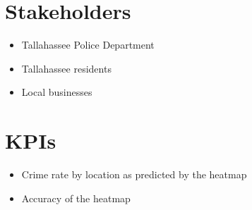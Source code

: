\documentclass[10pt]{article}
\begin{document}
\section{Stakeholders}
\begin{itemize}
    \item Tallahassee Police Department
    \item Tallahassee residents
    \item Local businesses
\end{itemize}


\section{KPIs}
\begin{itemize}
    \item Crime rate by location as predicted by the heatmap
    \item Accuracy of the heatmap
\end{itemize}

\end{document}
